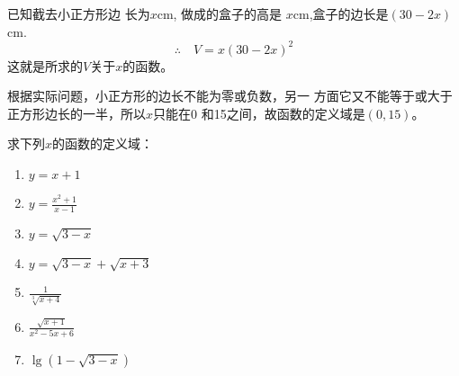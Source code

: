 \begin{solution}
    已知截去小正方形边
    长为$x$cm, 做成的盒子的高是
    $x$cm,盒子的边长是$(30-2x)$cm.
\[\therefore\quad     V=x(30-2x)^2\]
    这就是所求的$V$关于$x$的函数。

    根据实际问题，小正方形的边长不能为零或负数，另一
    方面它又不能等于或大于正方形边长的一半，所以$x$只能在0
    和15之间，故函数的定义域是$(0,15)$。
\end{solution}

\begin{example}    
    求下列$x$的函数的定义域：
    \begin{multicols}{2}
\begin{enumerate}
    \item $y=x+1$
    \item $y=\frac{x^2+1}{x-1}$
    \item $y=\sqrt{3-x}$
    \item $y=\sqrt{3-x}+\sqrt{x+3}$
    \item $\frac{1}{\sqrt[3]{x+4}}$
    \item $\frac{\sqrt{x+1}}{x^2-5x+6}$
    \item $\lg(1-\sqrt{3-x})$
\end{enumerate}        
    \end{multicols}
\end{example}

